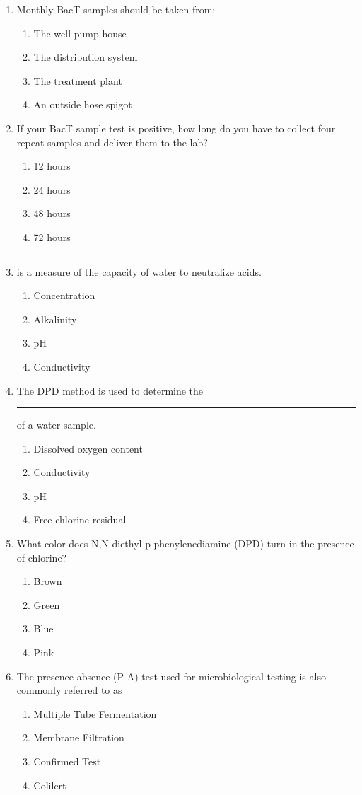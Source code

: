 \begin{enumerate}[1.]
\item Monthly BacT samples should be taken from:
\begin{enumerate}
\item The well pump house
\item The distribution system
\item The treatment plant
\item An outside hose spigot
\end{enumerate}

\item If your BacT sample test is positive, how long do you have to collect four repeat samples and deliver them to the lab?
\begin{enumerate}
\item 12 hours
\item 24 hours
\item 48 hours
\item 72 hours
\end{enumerate}

\item \rule{2cm}{0.3pt}is a measure of the capacity of water to neutralize acids.
\begin{enumerate}
\item Concentration
\item Alkalinity
\item pH
\item Conductivity
\end{enumerate}

\item The DPD method is used to determine the \rule{2cm}{0.3pt} of a water sample.
\begin{enumerate}
\item Dissolved oxygen content
\item Conductivity
\item pH
\item Free chlorine residual
\end{enumerate}

\item What color does N,N-diethyl-p-phenylenediamine (DPD) turn in the presence of
chlorine?
\begin{enumerate}
\item Brown
\item Green
\item Blue
\item Pink
\end{enumerate}

\item  The presence-absence (P-A) test used for microbiological testing is also commonly referred to as\\
\begin{enumerate}
\item Multiple Tube Fermentation\\
\item Membrane Filtration\\
\item Confirmed Test\\
\item Colilert
\end{enumerate}


\end{enumerate}
